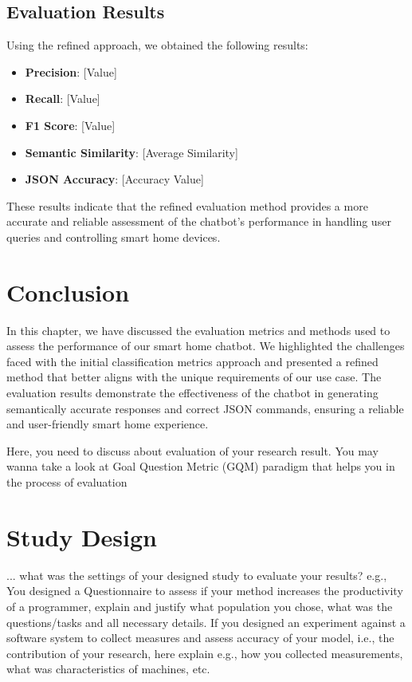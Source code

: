 \subsection{Evaluation Results}

Using the refined approach, we obtained the following results:
\begin{itemize}
    \item \textbf{Precision}: [Value]
    \item \textbf{Recall}: [Value]
    \item \textbf{F1 Score}: [Value]
    \item \textbf{Semantic Similarity}: [Average Similarity]
    \item \textbf{JSON Accuracy}: [Accuracy Value]
\end{itemize}

These results indicate that the refined evaluation method provides a more accurate and reliable assessment of the chatbot's performance in handling user queries and controlling smart home devices.

\section{Conclusion}

In this chapter, we have discussed the evaluation metrics and methods used to assess the performance of our smart home chatbot. We highlighted the challenges faced with the initial classification metrics approach and presented a refined method that better aligns with the unique requirements of our use case. The evaluation results demonstrate the effectiveness of the chatbot in generating semantically accurate responses and correct JSON commands, ensuring a reliable and user-friendly smart home experience.

Here, you need to discuss about evaluation of your research result. You may wanna take a look at Goal Question Metric (GQM) paradigm that helps you in the process of evaluation \cite{caldiera1994goal}

\section{Study Design}
... what was the settings of your designed study to evaluate your results? e.g., You designed a Questionnaire to assess if your method increases the productivity of a programmer, explain and justify what population you chose, what was the questions/tasks and all necessary details. If you designed an experiment against a software system to collect measures and assess accuracy of your model, i.e., the contribution of your research, here explain e.g., how you collected measurements, what was characteristics of machines, etc.

